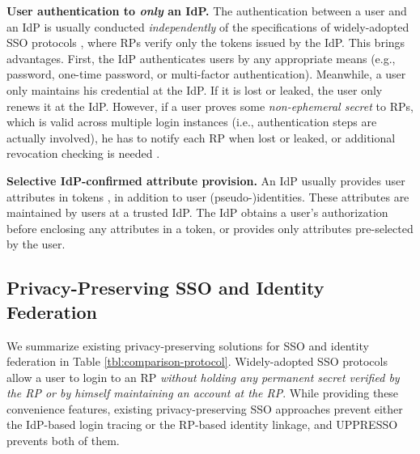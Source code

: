 \noindent\textbf{User authentication to {\em only} an IdP.}
The authentication between a user and an IdP is usually conducted \emph{independently}
    of the specifications of widely-adopted SSO protocols \cite{OpenIDConnect,rfc6749,SAML},
where RPs verify only the tokens issued by the IdP.
This brings advantages. First, the IdP authenticates users by any appropriate means (e.g., password,
one-time password, or multi-factor authentication).
Meanwhile, a user only maintains his credential at the IdP.
 If it is lost or leaked, the user only renews it at the IdP.
However, if a user proves some \emph{non-ephemeral secret} to RPs, which is valid across multiple login instances (i.e., authentication steps are actually involved),
 he has to notify each RP when lost or leaked, %
  or additional revocation checking is needed \cite{ELPASSO,UnlimitID}.


\noindent\textbf{Selective IdP-confirmed attribute provision.}
An IdP usually provides user attributes in tokens \cite{OpenIDConnect,rfc6749}, in addition to user (pseudo-)identities.
These attributes are maintained by users at a trusted IdP.
The IdP obtains a user's authorization before enclosing any attributes in a token, or provides only attributes pre-selected by the user.

\subsection{Privacy-Preserving SSO and Identity Federation}
\label{subsec-solutions}

We summarize existing privacy-preserving solutions for SSO and identity federation in Table \ref{tbl:comparison-protocol}.
Widely-adopted SSO protocols \cite{OpenIDConnect,rfc6749,SAML,SAMLIdentifier} allow a user to login to an RP
\emph{without holding any permanent secret verified by the RP or by himself maintaining an account at the RP}.
While providing these convenience features, existing privacy-preserving SSO approaches \cite{BrowserID,SPRESSO,NIST2017draft} prevent either the IdP-based login tracing or the RP-based identity linkage, and UPPRESSO prevents both of them.

